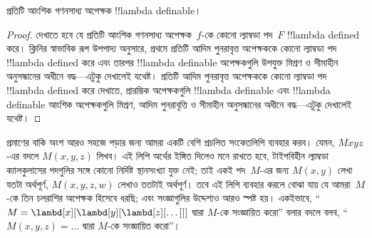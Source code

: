 \documentclass[../../../include/open-logic-section]{subfiles}
\begin{document}

\begin{thm}
প্রতিটি আংশিক গণনসাধ্য অপেক্ষক !!{lambda definable}।
\end{thm}

\begin{proof}
দেখাতে হবে যে প্রতিটি আংশিক গণনসাধ্য অপেক্ষক~$f$-কে কোনো ল্যাম্বডা
পদ~$F$ !!{lambda defined} করে। ক্লিনির স্বাভাবিক রূপ উপপাদ্য অনুসারে,
প্রথমে প্রতিটি আদিম পুনরাবৃত্ত অপেক্ষককে কোনো ল্যাম্বডা পদ
!!{lambda defined} করে এবং তারপর !!{lambda definable} অপেক্ষকগুলি
উপযুক্ত মিশ্রণ ও সীমাহীন অনুসন্ধানের অধীনে বদ্ধ---এটুকু দেখালেই যথেষ্ট। প্রতিটি আদিম
পুনরাবৃত্ত অপেক্ষককে কোনো ল্যাম্বডা পদ !!{lambda defined} করে দেখাতে,
প্রারম্ভিক অপেক্ষকগুলি !!{lambda definable} এবং !!{lambda definable}
আংশিক অপেক্ষকগুলি মিশ্রণ, আদিম পুনরাবৃত্তি ও সীমাহীন অনুসন্ধানের অধীনে
বদ্ধ---এটুকু দেখালেই যথেষ্ট।
\end{proof}

প্রমাণের বাকি অংশ আরও সহজে পড়ার জন্য আমরা একটি বেশি প্রচলিত সংকেতলিপি
ব্যবহার করব। যেমন, $Mxyz$-এর বদলে $M(x, y, z)$ লিখব। এই লিপি অর্থের
ইঙ্গিত দিলেও মনে রাখতে হবে, টাইপবিহীন ল্যাম্বডা ক্যালকুলাসের পদগুলির সঙ্গে
কোনো নির্দিষ্ট স্থানসংখ্যা যুক্ত নেই; তাই একই পদ~$M$-এর জন্য $M(x,y)$
লেখা যতটা অর্থপূর্ণ, $M(x,y,z,w)$ লেখাও ততটাই অর্থপূর্ণ। তবে এই লিপি
ব্যবহার করলে বোঝা যায় যে আমরা~$M$-কে তিন চলরাশির অপেক্ষক হিসেবে ধরছি;
এবং সংজ্ঞাগুলির উদ্দেশ্যও আরও স্পষ্ট হয়। একইভাবে, ``$M =
\lambd[x][\lambd[y][\lambd[z][\dots]]]$ দ্বারা $M$-কে সংজ্ঞায়িত করো''
বলার বদলে বলব, ``$M(x,y,z) = \dots$ দ্বারা $M$-কে সংজ্ঞায়িত করো''।
\end{document}
